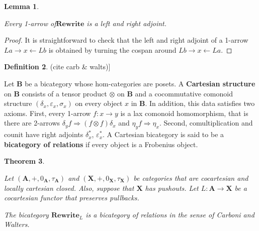 \documentclass[]{amsart}
\renewcommand{\epsilon}{\varepsilon}
\newcommand{\A}{\cat{A}}
\newcommand{\X}{\cat{X}}
\newcommand{\defn}[1]{\textbf{#1}}
\newcommand{\cat}[1]{\mathbf{#1}}
\newcommand{\from}{\colon}
\newcommand{\Rewrite}{\mathbf{Rewrite} }
\newcommand{\edit}[1]{\textcolor{editcolour}{(#1)}}
\newtheorem{theorem}{Theorem}[section]
\newtheorem{lemma}[theorem]{Lemma}
\theoremstyle{remark}
\theoremstyle{definition}
\newtheorem{definition}[theorem]{Definition}
\begin{document}

\begin{lemma} \label{thm:bicat-rewr-arrows-dual}
  
  Every 1-arrow of$ \Rewrite $ is a left and right adjoint.
  
\end{lemma}

\begin{proof}
  
  It is straightforward to check that the left and right adjoint of a
  1-arrow $ La \to x \gets Lb $ is obtained by turning the cospan
  around $ Lb \to x \gets La $.
  
\end{proof}


\begin{definition}\edit{cite carb \& walts}] \label{def:bicat-rels}

  Let $ \cat{B} $ be a bicategory whose hom-categories are posets. A
  \defn{Cartesian structure} on $ \cat{B} $ consists of a tensor
  product $ \otimes $ on $ \cat{B} $ and a cocommutative comonoid
  structure $ (\delta_x , \epsilon_x , \sigma_x ) $ on every object
  $ x $ in $ \cat{B} $.  In addition, this data satisfies two
  axioms. First, every 1-arrow $ f \from x \to y $ is a lax comonoid
  homomorphism, that is there are 2-arrows
  $ \delta_y f \Rightarrow (f \otimes f) \delta_x $ and
  $ \eta_y f \Rightarrow \eta_x $. Second, comultiplication and counit
  have right adjoints $ \delta^\ast_x $, $ \epsilon^\ast_x $. A
  Cartesian bicategory is said to be a \defn{bicategory of relations}
  if every object is a Frobenius object.
  
 \end{definition}


 \begin{theorem} \label{thm:bicat-rewr-bicat-rel}

   Let $ (\A , + , 0_\A , \tau_\A ) $ and
   $ (\X , + , 0_\X , \tau_\X ) $ be categories that are cocartesian
   and locally cartesian closed. Also, suppose that $ \X $ has
   pushouts. Let $ L \from \A \to \X $ be a cocartesian functor that
   preserves pullbacks.
 	
   The bicategory $ \Rewrite_{L} $ is a bicategory of relations in the
   sense of Carboni and Walters.
   
\end{theorem}
\end{document}
